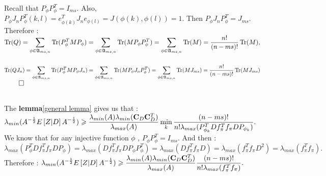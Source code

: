 Recall that $P_{\phi}P_{\phi}^{T}=I_{ms}$. Also, $P_{\phi}J_{n}P_{\phi}^{T}(k,l) = e_{\phi(k)}^{T}J_{n}e_{\phi(l)} = J(\phi(k),\phi(l)) = 1.$ Then $P_{\phi}J_{n}P_{\phi}^{T} = J_{ms}.$\\

Therefore : $\operatorname{Tr}(Q) = \displaystyle\sum\limits_{\phi \in \mathfrak{A}_{ms,n}} \operatorname{Tr}(P_{\phi}^{T} M P_{\phi}) = \displaystyle\sum\limits_{\phi \in \mathfrak{A}_{ms,n}} \operatorname{Tr}(M P_{\phi} P_{\phi}^{T} )= \displaystyle\sum\limits_{\phi \in \mathfrak{A}_{ms,n}} \operatorname{Tr}(M) = \displaystyle\frac{n!}{(n-ms)!}\operatorname{Tr}(M),$\\\\
 $\operatorname{Tr}(QJ_{n}) = \displaystyle\sum\limits_{\phi \in \mathfrak{A}_{ms,n}} \operatorname{Tr}(P_{\phi}^{T} M P_{\phi}J_{n}) = \displaystyle\sum\limits_{\phi \in \mathfrak{A}_{ms,n}} \operatorname{Tr}(M P_{\phi} J_{n}P_{\phi}^{T} )= \displaystyle\sum\limits_{\phi \in \mathfrak{A}_{ms,n}} \operatorname{Tr}(MJ_{ms}) = \displaystyle\frac{n!}{(n-ms)!}\operatorname{Tr}(MJ_{ms})$ $\qed$\\\\




\pr

The \textbf{lemma}\ref{general lemma} gives us that :\\ 
$\displaystyle \lambda_{min}(A^{-\frac12}E\left[Z|D\right]A^{-\frac12} ) \geqslant \displaystyle  \frac{\lambda_{min}(A) \lambda_{min}(\bold{C}_{D} \bold{C}_{D}^{T})}{ \lambda_{max}(A)} \min_{k} \frac{(n-ms)!}{n!\lambda_{max}( P_{\phi_{k}}^{T} D f_{\pi}^{T} f_{\pi} D P_{\phi_{k}} )}.$\\

We know that for any injective function $\phi$ , $P_{\phi} P_{\phi}^{T} = I_{ms}$. And then :\\
$\lambda_{max}( P_{\phi}^{T} D f_{\pi}^{T} f_{\pi} D P_{\phi} ) = \lambda_{max}( D f_{\pi}^{T} f_{\pi} D P_{\phi} P_{\phi}^{T} ) = \lambda_{max}( D f_{\pi}^{T} f_{\pi} D ) =  \lambda_{max}( f_{\pi}^{T} f_{\pi} D^{2} )  =  \lambda_{max}(f_{\pi}^{T} f_{\pi}).$\\
Therefore : $\displaystyle \lambda_{min}(A^{-\frac12}E\left[Z|D\right]A^{-\frac12} ) \geqslant \displaystyle  \frac{\lambda_{min}(A) \lambda_{min}(\bold{C}_{D} \bold{C}_{D}^{T})}{ \lambda_{max}(A)} \frac{(n-ms)!}{n!\lambda_{max}(f_{\pi}^{T} f_{\pi})}.$\\

